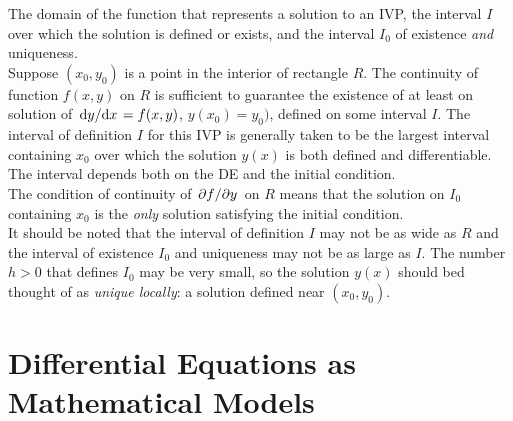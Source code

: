 \documentclass[../Differential Equations.tex]{subfiles}
\begin{document}
			The domain of the function that represents a solution to an IVP, the interval \(I\) over which the solution is defined or exists, and the interval \(I_0\) of existence \textit{and} uniqueness. \\
			Suppose \((x_0, y_0)\) is a  point in the interior of rectangle \(R\). The continuity of function \(f(x, y)\) on \(R\) is sufficient to guarantee the existence of at least on solution of \(\dv*{y}{x} = f(x, y)\), \(y(x_0) = y_0)\), defined on some interval \(I\). The interval of definition \(I\) for this IVP is generally taken to be the largest interval containing \(x_0\) over which the solution \(y(x)\) is both defined and differentiable. The interval depends both on the DE and the initial condition. \\
			The condition of continuity of \(\pdv*{f}{y}\) on \(R\) means that the solution on \(I_0\) containing \(x_0\) is the \textit{only} solution satisfying the initial condition. \\
			It should be noted that the interval of definition \(I\) may not be as wide as \(R\) and the interval of existence \(I_0\) and uniqueness may not be as large as \(I\). The number \(h > 0\) that defines \(I_0\) may be very small, so the solution \(y(x)\) should bed thought of as \textit{unique locally}: a solution defined near \((x_0, y_0)\).
	\section{Differential Equations as Mathematical Models}
\end{document}
